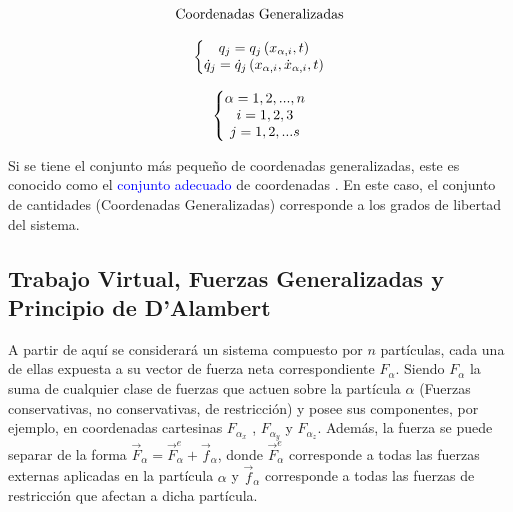 \documentclass[/home/hernan/Documentos/Apuntes_mecanica_teorica/main.tex]{subfiles}
\begin{document}
\begin{definition}
\begin{equation*}
\begin{matrix}
                \begin{matrix}
                    \textup{Coordenadas Generalizadas} \\ 
                    \\ 
                    \left\{\begin{matrix}
                                q_{j} = q_{j} \left ( x_{\alpha,i}, t \right )\\ 
                                \dot{q}_{j} = \dot{q}_{j} \left ( x_{\alpha,i}, \dot{x}_{\alpha,i} , t\right )
                            \end{matrix}\right .
                
                \end{matrix} 
                \\ 
                \\ 
                \left\{\begin{matrix}
                            \alpha = 1,2,...,n\\ 
                            i= 1,2,3\\ 
                            j= 1,2,...s
                        \end{matrix}\right .
            \end{matrix}
        \end{equation*}

        Si se tiene el conjunto más pequeño de coordenadas generalizadas, este es conocido como el \textcolor{blue}{conjunto adecuado} de coordenadas . En este caso, el conjunto de cantidades (Coordenadas Generalizadas) corresponde a los grados de libertad del sistema.
    \end{definition}

    \subsection{Trabajo Virtual, Fuerzas Generalizadas y Principio de D'Alambert}

    A partir de aquí se considerará un sistema compuesto por $n$ partículas, cada una de ellas expuesta a su vector de fuerza neta correspondiente $F_{\alpha}$. Siendo $F_{\alpha}$ la suma de cualquier clase de fuerzas que actuen sobre la partícula $\alpha$ (Fuerzas conservativas,  no conservativas, de restricción) y posee sus componentes, por ejemplo, en coordenadas cartesinas $F_{\alpha_{x}}$ , $F_{\alpha_{y}}$ y $F_{\alpha_{z}}$. Además, la fuerza se puede separar de la forma $\vec{F}_{\alpha} = \vec{F}_{\alpha} ^{e} + \vec{f}_{\alpha} $, donde $\vec{F}_{\alpha} ^{e}$ corresponde a todas las fuerzas externas aplicadas en la partícula $\alpha$ y $\vec{f}_{\alpha}$ corresponde a todas las fuerzas de restricción que afectan a dicha partícula.
\end{document}
